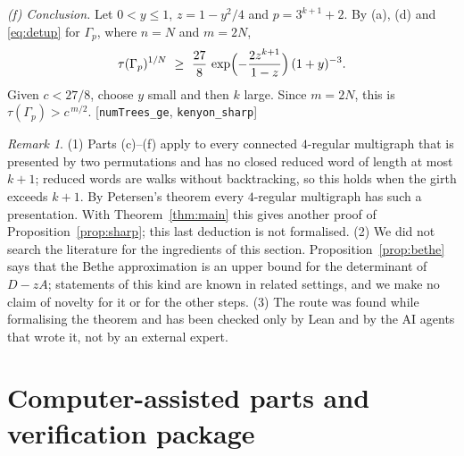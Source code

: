 \documentclass[11pt]{amsart}
\theoremstyle{plain}
\theoremstyle{remark}
\newtheorem{remark}[theorem]{Remark}
\newcommand{\code}[1]{\texttt{#1}}
\begin{document}
\smallskip\noindent\emph{(f) Conclusion.} Let $0<y\le1$, $z=1-y^2/4$ and $p=3^{k+1}+2$. By (a), (d) and
\eqref{eq:detup} for $\Gamma_p$, where $n=N$ and $m=2N$,
\[
  \tau(\Gamma_p)^{1/N}\ \ge\ \frac{27}{8}\,\exp\Bigl(-\frac{2z^{k+1}}{1-z}\Bigr)\,(1+y)^{-3}.
\]
Given $c<27/8$, choose $y$ small and then $k$ large. Since $m=2N$, this is $\tau(\Gamma_p)>c^{\,m/2}$.
[\code{numTrees\_ge}, \code{kenyon\_sharp}]

\begin{remark}\label{rem:second}
\textup{(1)} Parts (c)--(f) apply to every connected $4$-regular multigraph that is presented by two permutations
and has no closed reduced word of length at most $k+1$; reduced words are walks without backtracking, so this
holds when the girth exceeds $k+1$. By Petersen's theorem every $4$-regular multigraph has such a presentation.
With Theorem~\ref{thm:main} this gives another proof of Proposition~\ref{prop:sharp}; this last deduction is
not formalised. \textup{(2)} We did not search the literature for the ingredients of this section.
Proposition~\ref{prop:bethe} says that the Bethe approximation is an upper bound for the determinant of $D-zA$;
statements of this kind are known in related settings, and we make no claim of novelty for it or for the other
steps. \textup{(3)} The route was found while formalising the theorem and has been checked only by Lean and by
the AI agents that wrote it, not by an external expert.
\end{remark}

\appendix
\section{Computer-assisted parts and verification package}\label{app:num}
\end{document}
